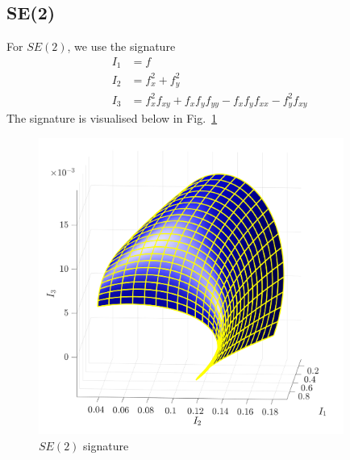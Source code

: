 \documentclass[11pt]{article}
\begin{document}
\subsection{SE(2)}
For $SE(2)$, we use the signature
\begin{equation}\label{eq:se2sig}
  \begin{split}
    I_1 &= f \\
    I_2 &= f_x^2 + f_y^2 \\
    I_3 &= f_x^2 f_{xy} + f_x f_y f_{yy} - f_x f_y f_{xx} - f_y^2 f_{xy}
  \end{split}
\end{equation}
The signature is visualised below in Fig.~\ref{fig:se2signature}
\begin{figure}
  \centering
    \includegraphics[width=10cm]{figures/SE2_signature}
  \caption{$SE(2)$ signature}
  \label{fig:se2signature}
\end{figure}
\end{document}
